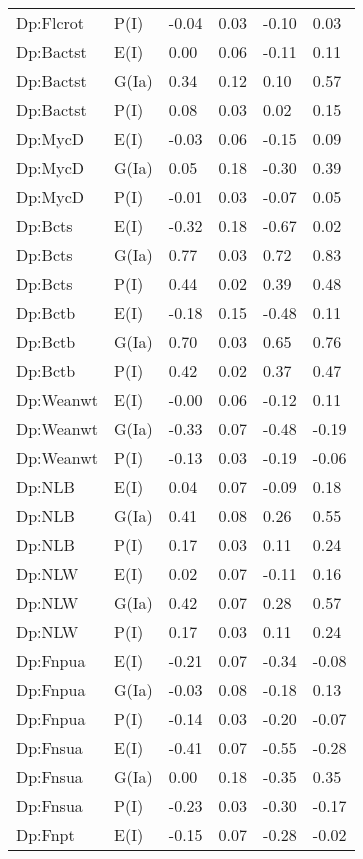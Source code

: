 \begin{center}
\begin{longtable}{|p{1.1in}|p{0.7in}|p{0.7in}|p{0.6in}|p{0.6in}|p{0.6in}|}
  Dp:Flcrot & P(I) & -0.04 & 0.03 & -0.10 & 0.03 \\ 
  Dp:Bactst & E(I) & 0.00 & 0.06 & -0.11 & 0.11 \\ 
  Dp:Bactst & G(Ia) & 0.34 & 0.12 & 0.10 & 0.57 \\ 
  Dp:Bactst & P(I) & 0.08 & 0.03 & 0.02 & 0.15 \\ 
  Dp:MycD & E(I) & -0.03 & 0.06 & -0.15 & 0.09 \\ 
  Dp:MycD & G(Ia) & 0.05 & 0.18 & -0.30 & 0.39 \\ 
  Dp:MycD & P(I) & -0.01 & 0.03 & -0.07 & 0.05 \\ 
  Dp:Bcts & E(I) & -0.32 & 0.18 & -0.67 & 0.02 \\ 
  Dp:Bcts & G(Ia) & 0.77 & 0.03 & 0.72 & 0.83 \\ 
  Dp:Bcts & P(I) & 0.44 & 0.02 & 0.39 & 0.48 \\ 
  Dp:Bctb & E(I) & -0.18 & 0.15 & -0.48 & 0.11 \\ 
  Dp:Bctb & G(Ia) & 0.70 & 0.03 & 0.65 & 0.76 \\ 
  Dp:Bctb & P(I) & 0.42 & 0.02 & 0.37 & 0.47 \\ 
  Dp:Weanwt & E(I) & -0.00 & 0.06 & -0.12 & 0.11 \\ 
  Dp:Weanwt & G(Ia) & -0.33 & 0.07 & -0.48 & -0.19 \\ 
  Dp:Weanwt & P(I) & -0.13 & 0.03 & -0.19 & -0.06 \\ 
  Dp:NLB & E(I) & 0.04 & 0.07 & -0.09 & 0.18 \\ 
  Dp:NLB & G(Ia) & 0.41 & 0.08 & 0.26 & 0.55 \\ 
  Dp:NLB & P(I) & 0.17 & 0.03 & 0.11 & 0.24 \\ 
  Dp:NLW & E(I) & 0.02 & 0.07 & -0.11 & 0.16 \\ 
  Dp:NLW & G(Ia) & 0.42 & 0.07 & 0.28 & 0.57 \\ 
  Dp:NLW & P(I) & 0.17 & 0.03 & 0.11 & 0.24 \\ 
  Dp:Fnpua & E(I) & -0.21 & 0.07 & -0.34 & -0.08 \\ 
  Dp:Fnpua & G(Ia) & -0.03 & 0.08 & -0.18 & 0.13 \\ 
  Dp:Fnpua & P(I) & -0.14 & 0.03 & -0.20 & -0.07 \\ 
  Dp:Fnsua & E(I) & -0.41 & 0.07 & -0.55 & -0.28 \\ 
  Dp:Fnsua & G(Ia) & 0.00 & 0.18 & -0.35 & 0.35 \\ 
  Dp:Fnsua & P(I) & -0.23 & 0.03 & -0.30 & -0.17 \\ 
  Dp:Fnpt & E(I) & -0.15 & 0.07 & -0.28 & -0.02 \\ 

\end{longtable}
\end{center}
